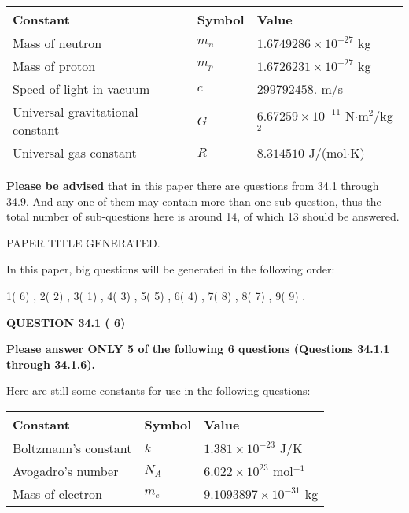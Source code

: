 \documentclass[12pt]{article}
\begin{document}
 
\noindent\begin{tabular}{|l|l|l|}
\hline
Constant & Symbol & Value \\
\hline
Mass of neutron &
$m_n$ &
 $ 1.6749286 \times 10^{-27} $
kg \\
\hline
Mass of proton &
$m_p$ &
 $ 1.6726231 \times 10^{-27} $
kg \\
\hline
Speed of light in vacuum &
$c$ &
 $ 299792458. $
m/s \\
\hline
Universal gravitational constant &
$G$ &
 $ 6.67259 \times 10^{-11} $
N$\cdot $m$^2$/kg$^2$ \\
\hline
Universal gas constant &
$R$ &
 $ 8.314510 $
J/(mol$\cdot $K) \\
\hline
\end{tabular}
 
 
{\textbf{\large{Please be advised}}} that in this paper there are questions from
34.1 through
34.9.
And any one of them may contain more than one sub-question, thus the total number
of sub-questions here is around 14, of which
13 should be answered.
 
\vspace{0.3in}
 
 
   
   
 PAPER TITLE GENERATED.
   
   
   
\vspace{0.2in}
   
In this paper, big questions will be generated in the following order: 
   
   
            1(          6)
 ,
            2(          2)
 ,
            3(          1)
 ,
            4(          3)
 ,
            5(          5)
 ,
            6(          4)
 ,
            7(          8)
 ,
            8(          7)
 ,
            9(          9)
 .
  
\vspace{0.2in}
  
{\textbf{\Large{QUESTION
34.1 
 (          6)
}}}
  
  
 
{\textbf{\Large{Please answer ONLY
5 of the following
6 questions (Questions
34.1.1 through
34.1.6). }}}
 
Here are still some constants for use in the following questions:
 
 
\noindent\begin{tabular}{|l|l|l|}
\hline
Constant & Symbol & Value \\
\hline
 
Boltzmann's constant &
$k$ &
 $ 1.381 \times 10^{-23} $
J/K \\
\hline
 
Avogadro's number &
$N_A$ &
 $ 6.022 \times 10^{23} $
mol$^{-1}$ \\
\hline
 
Mass of electron &
$m_e$ &
 $ 9.1093897 \times 10^{-31} $
kg \\
\hline
 
\end{tabular}
 
\end{document}
